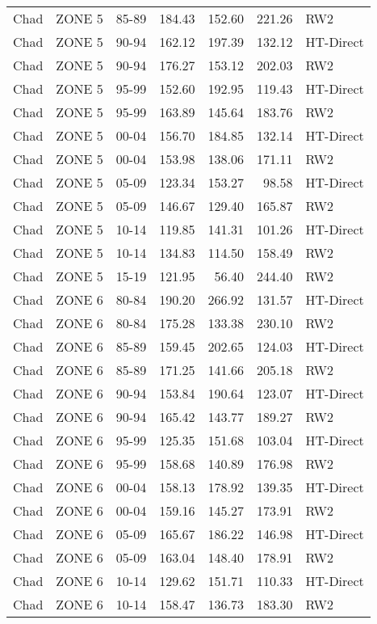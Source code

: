 \begin{longtable}{lllrrrl}
  Chad & ZONE 5 & 85-89 & 184.43 & 152.60 & 221.26 & RW2 \\ 
  Chad & ZONE 5 & 90-94 & 162.12 & 197.39 & 132.12 & HT-Direct \\ 
  Chad & ZONE 5 & 90-94 & 176.27 & 153.12 & 202.03 & RW2 \\ 
  Chad & ZONE 5 & 95-99 & 152.60 & 192.95 & 119.43 & HT-Direct \\ 
  Chad & ZONE 5 & 95-99 & 163.89 & 145.64 & 183.76 & RW2 \\ 
  Chad & ZONE 5 & 00-04 & 156.70 & 184.85 & 132.14 & HT-Direct \\ 
  Chad & ZONE 5 & 00-04 & 153.98 & 138.06 & 171.11 & RW2 \\ 
  Chad & ZONE 5 & 05-09 & 123.34 & 153.27 & 98.58 & HT-Direct \\ 
  Chad & ZONE 5 & 05-09 & 146.67 & 129.40 & 165.87 & RW2 \\ 
  Chad & ZONE 5 & 10-14 & 119.85 & 141.31 & 101.26 & HT-Direct \\ 
  Chad & ZONE 5 & 10-14 & 134.83 & 114.50 & 158.49 & RW2 \\ 
  Chad & ZONE 5 & 15-19 & 121.95 & 56.40 & 244.40 & RW2 \\ 
  Chad & ZONE 6 & 80-84 & 190.20 & 266.92 & 131.57 & HT-Direct \\ 
  Chad & ZONE 6 & 80-84 & 175.28 & 133.38 & 230.10 & RW2 \\ 
  Chad & ZONE 6 & 85-89 & 159.45 & 202.65 & 124.03 & HT-Direct \\ 
  Chad & ZONE 6 & 85-89 & 171.25 & 141.66 & 205.18 & RW2 \\ 
  Chad & ZONE 6 & 90-94 & 153.84 & 190.64 & 123.07 & HT-Direct \\ 
  Chad & ZONE 6 & 90-94 & 165.42 & 143.77 & 189.27 & RW2 \\ 
  Chad & ZONE 6 & 95-99 & 125.35 & 151.68 & 103.04 & HT-Direct \\ 
  Chad & ZONE 6 & 95-99 & 158.68 & 140.89 & 176.98 & RW2 \\ 
  Chad & ZONE 6 & 00-04 & 158.13 & 178.92 & 139.35 & HT-Direct \\ 
  Chad & ZONE 6 & 00-04 & 159.16 & 145.27 & 173.91 & RW2 \\ 
  Chad & ZONE 6 & 05-09 & 165.67 & 186.22 & 146.98 & HT-Direct \\ 
  Chad & ZONE 6 & 05-09 & 163.04 & 148.40 & 178.91 & RW2 \\ 
  Chad & ZONE 6 & 10-14 & 129.62 & 151.71 & 110.33 & HT-Direct \\ 
  Chad & ZONE 6 & 10-14 & 158.47 & 136.73 & 183.30 & RW2 \\ 

\end{longtable}
